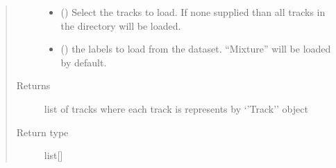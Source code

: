 \documentclass[letterpaper,10pt,english,openany,oneside]{sphinxmanual}
\begin{document}
\begin{fulllineitems}
\begin{fulllineitems}
\begin{quote}
\begin{description}
\begin{itemize}
\item {} 
 (\sphinxstyleliteralemphasis{\sphinxupquote{{[}}}\sphinxstyleliteralemphasis{\sphinxupquote{{]}}}\sphinxstyleliteralemphasis{\sphinxupquote{, }}) \textendash{} Select the tracks to load.
If none supplied than all tracks in the directory will be loaded.

\item {} 
 () \textendash{} the labels to load from the dataset.
“Mixture” will be loaded by default.

\end{itemize}

\item[{Returns}] \leavevmode
list of tracks where each track is represents by ‘’Track’’ object

\item[{Return type}] \leavevmode
list{[}{\hyperref[\detokenize{docs/source/application.model:application.model.Track}]{}}{]}

\end{description}\end{quote}

\end{fulllineitems}


\end{fulllineitems}
\end{document}
